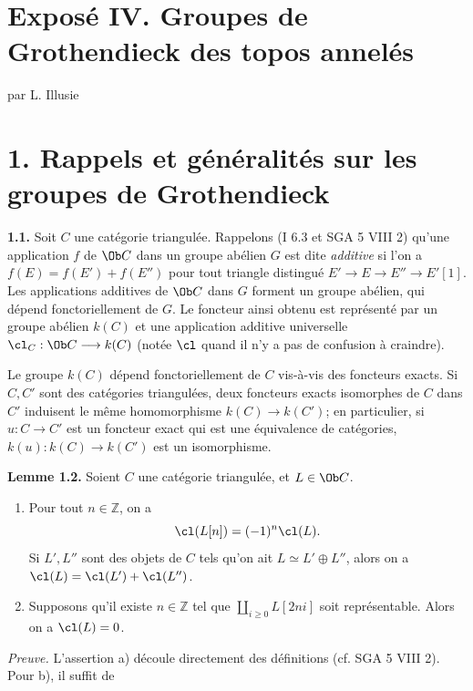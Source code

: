 \section*{Exposé IV. Groupes de Grothendieck des topos annelés}
\begin{center}
par L. Illusie
\end{center}

\section*{1. Rappels et généralités sur les groupes de Grothendieck}

\textbf{1.1.} Soit \(C\) une catégorie triangulée. Rappelons (I 6.3 et SGA 5 VIII 2) qu'une application \(f\) de \(\Ob C\) dans un groupe abélien \(G\) est dite \emph{additive} si l'on a \(f(E)=f(E')+f(E'')\) pour tout triangle distingué \(E'\longrightarrow E\longrightarrow E''\longrightarrow E'[1]\). Les applications additives de \(\Ob C\) dans \(G\) forment un groupe abélien, qui dépend fonctoriellement de \(G\). Le foncteur ainsi obtenu est représenté par un groupe abélien \(k(C)\) et une application additive universelle \(\cl_C:\Ob C\longrightarrow k(C)\) (notée \(\cl\) quand il n'y a pas de confusion à craindre).

Le groupe \(k(C)\) dépend fonctoriellement de \(C\) vis-à-vis des foncteurs exacts. Si \(C,C'\) sont des catégories triangulées, deux foncteurs exacts isomorphes de \(C\) dans \(C'\) induisent le même homomorphisme \(k(C)\to k(C')\); en particulier, si \(u:C\to C'\) est un foncteur exact qui est une équivalence de catégories, \(k(u):k(C)\to k(C')\) est un isomorphisme.

\textbf{Lemme 1.2.} Soient \(C\) une catégorie triangulée, et \(L\in\Ob C\).
\begin{enumerate}[label=\alph*)]
\item Pour tout \(n\in\mathbb Z\), on a
\[
 \cl(L[n])=(-1)^n\cl(L).
\]
Si \(L',L''\) sont des objets de \(C\) tels qu'on ait \(L\simeq L'\oplus L''\), alors on a \(\cl(L)=\cl(L')+\cl(L'')\).
\item Supposons qu'il existe \(n\in\mathbb Z\) tel que \(\coprod_{i\geq0} L[2ni]\) soit représentable. Alors on a \(\cl(L)=0\).
\end{enumerate}

\emph{Preuve.} L'assertion a) découle directement des définitions (cf. SGA 5 VIII 2). Pour b), il suffit de
